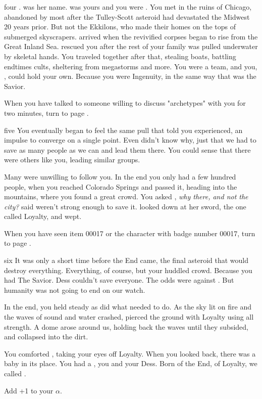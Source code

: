 \documentclass[greennotebook]{Silversiders} %
\begin{document}
\begin{page}{four}
\emph{\cSavior{}}. \cSavior{\intro} was her name. \cSavior{\They} was yours and you were \cIngenuity{\theirs}. You met \cSavior{\them} in the ruins of Chicago, abandoned by most after the Tulley-Scott asteroid had devastated the Midwest 20 years prior. But not the Ekkilons, who made their homes on the tops of submerged skyscrapers. \cSavior{\They} arrived when the revivified corpses began to rise from the Great Inland Sea. \cSavior{} rescued you after the rest of your family was pulled underwater by skeletal hands. You traveled together after that, stealing boats, battling endtimes cults, sheltering from megastorms and more. You were a team, and you, \cIngenuityOld{}, could hold your own. Because you were Ingenuity, in the same way that \cSavior{\they} was the Savior.

When you have talked to someone willing to discuss "archetypes" with you for two minutes, turn to page .
\end{page}

\begin{page}{five}
You eventually began to feel the same pull that \cSavior{} told you \cSavior{\they} experienced, an impulse to converge on a single point. Even \cSavior{\they} didn't know why, just that we had to save as many people as we can and lead them there. You could sense that there were others like you, leading similar groups. 

Many were unwilling to follow you. In the end you only had a few hundred people, when you reached Colorado Springs and passed it, heading into the mountains, where you found a great crowd. You asked \cSavior{\them}, \emph{why there, and not the city?} \cSavior{\They} said \cSavior{\they} weren't strong enough to save it. \cSavior{\They} looked down at her sword, the one \cSavior{\they} called Loyalty, and wept.

When you have seen item 00017 or the character with badge number 00017, turn to page .
\end{page}

\begin{page}{six}
It was only a short time before the End came, the final asteroid that would destroy everything. Everything, of course, but your huddled crowd. Because you had The Savior. Dess couldn't save everyone. The odds were against \cSavior{\them}. But humanity was not going to end on our watch.

In the end, you held \cSavior{\them} steady as \cSavior{\they} did what \cSavior{\they} needed to do. As the sky lit on fire and the waves of sound and water crashed, \cSavior{\they} pierced the ground with Loyalty using all \cSavior{\their} strength. A dome arose around us, holding back the waves until they subsided, and \cSavior{\they} collapsed into the dirt.

You comforted \cSavior{\them}, taking your eyes off Loyalty. When you looked back, there was a baby in its place. You had a \cLoyalty{\offspring}, you and your Dess. Born of the End, of Loyalty, we called \cLoyalty{\them} \cLoyalty{\intro}.

Add +1 to your $\alpha$.
\end{page}

\endnotebook
\end{document}
